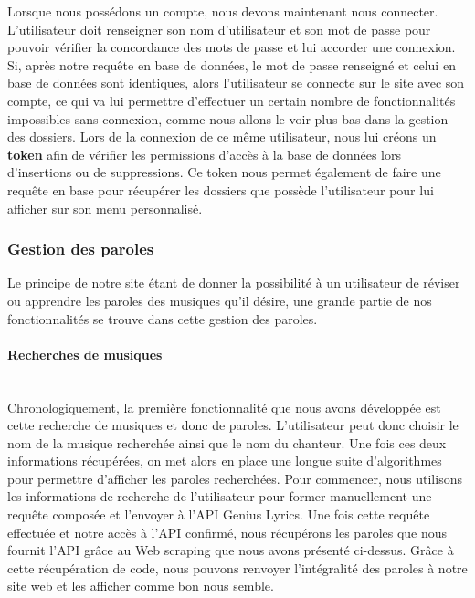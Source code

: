 \documentclass[12pt,french]{article}
\begin{document}
Lorsque nous possédons un compte, nous devons maintenant nous connecter. L'utilisateur doit renseigner son nom d'utilisateur et son mot de passe pour pouvoir vérifier la concordance des mots de passe et lui accorder une connexion. Si, après notre requête en base de données, le mot de passe renseigné et celui en base de données sont identiques, alors l'utilisateur se connecte sur le site avec son compte, ce qui va lui permettre d'effectuer un certain nombre de fonctionnalités impossibles sans connexion, comme nous allons le voir plus bas dans la gestion des dossiers. Lors de la connexion de ce même utilisateur, nous lui créons un \textbf{token} afin de vérifier les permissions d'accès à la base de données lors d'insertions ou de suppressions. Ce token nous permet également de faire une requête en base pour récupérer les dossiers que possède l'utilisateur pour lui afficher sur son menu personnalisé.

\subsubsection{Gestion des paroles}

Le principe de notre site étant de donner la possibilité à un utilisateur de réviser ou apprendre les paroles des musiques qu'il désire, une grande partie de nos fonctionnalités se trouve dans cette gestion des paroles. 

\paragraph{Recherches de musiques \\\\}

Chronologiquement, la première fonctionnalité que nous avons développée est cette recherche de musiques et donc de paroles. L'utilisateur peut donc choisir le nom de la musique recherchée ainsi que le nom du chanteur. Une fois ces deux informations récupérées, on met alors en place une longue suite d'algorithmes pour permettre d'afficher les paroles recherchées. Pour commencer, nous utilisons les informations de recherche de l'utilisateur pour former manuellement une requête composée et l'envoyer à l'\gls{API} Genius Lyrics. Une fois cette requête effectuée et notre accès à l'\gls{API} confirmé, nous récupérons les paroles que nous fournit l'\gls{API} grâce au \gls{Web scraping} que nous avons présenté ci-dessus. Grâce à cette récupération de code, nous pouvons renvoyer l'intégralité des paroles à notre site web et les afficher comme bon nous semble.
\end{document}

